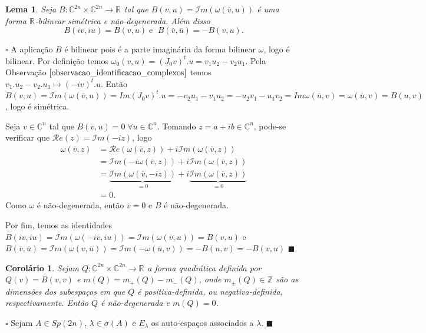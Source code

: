 \documentclass[12pt]{book}
\newtheorem{corolario}[teorema]{Corolário}
\newtheorem{lema}[teorema]{Lema}
\newenvironment{prova}[1]{$\square$ #1}{\hfill$\blacksquare$}
\newcommand{\complexo}[1]{\mathbb{C}^{#1}}
\newcommand{\estruturacomplexa}{J_{0}}
\newcommand{\formaSimpletica}[2]{\omega(#1, #2)}
\newcommand{\formaSimpleticaPadrao}[2]{\omega_{0}(#1, #2)}
\newcommand{\gruposimpletico}[1]{Sp(#1)}
\newcommand{\inteiros}{\mathbb{Z}}
\newcommand{\parteImaginaria}[1]{\mathcal{I}m(#1)}
\newcommand{\parteReal}[1]{\mathcal{R}e(#1)}
\newcommand{\real}[1]{\mathbb{R}^{#1}}
\newcommand{\reta}{\real{}}
\newcommand{\vermelho}[1]{{\color{red}#1}}
\begin{document}
		\begin{lema}
			Seja $B:\complexo{2n}\times \complexo{2n} \to \reta$ tal que $B(v, u ) = \parteImaginaria{\formaSimpletica{\overline{v}}{u}}$ é uma forma $\reta$-bilinear simétrica e não-degenerada. Além disso
			$$
			B(iv,iu) = B(v,u)\;\text{e }\;B(\overline{v},\overline{u})=-B(v,u).
			$$
		\end{lema}
		\begin{prova}
		A aplicação $B$ é bilinear pois é a parte imaginária da forma bilinear $\omega$, logo é bilinear. \vermelho{Por definição temos $\formaSimpleticaPadrao{v}{u} = (\estruturacomplexa v)^{t}.u=v_{1}u_{2}-v_{2}u_{1}$. Pela Observação $\ref{observacao_identificacao_complexos}$ temos $v_{1}.u_{2}-v_{2}.u_{1} \mapsto (-iv)^{t}.u$. Então $B(v,u) =  \parteImaginaria{\omega(\overline{v}, u)}=Im (\estruturacomplexa v)^{t}.u = -v_{2}u_{1} -v_{1}u_{2} = -u_{2}v_{1}-u_{1}v_{2}  = Im \omega(\overline{u}, v) = \omega(\overline{u}, v) = B(u,v)$, logo é simétrica.}
		
		Seja $v \in \complexo{n}$ tal que $B(v, u) = 0 \; \forall u \in \complexo{n}$. Tomando $z=a+ib \in \complexo{n}$, pode-se verificar que $\parteReal{z} = \parteImaginaria{-iz}$, logo 
		$$
			\begin{aligned}
			\formaSimpletica{\overline{v}}{z} &=\parteReal{\formaSimpletica{\overline{v}}{z}} +i \parteImaginaria{\formaSimpletica{\overline{v}}{z}} 
			\\
			&= \parteImaginaria{-i\formaSimpletica{\overline{v}}{z}} +i \parteImaginaria{\formaSimpletica{\overline{v}}{z}}
			\\
			&= \underbrace{\parteImaginaria{\formaSimpletica{\overline{v}}{-iz}}}_{=0} +i \underbrace{\parteImaginaria{\formaSimpletica{\overline{v}}{z}}}_{=0}
			\\
			&=0.
			\end{aligned}
		$$
		Como $\omega$ é não-degenerada, então $\overline{v} = 0$ e $B$ é não-degenerada.
		
		Por fim, temos as identidades $B(iv,iu) = \parteImaginaria{\formaSimpletica{-i\overline{v}}{iu}}= \parteImaginaria{\formaSimpletica{\overline{v}}{u}}=B(v,u)$ e $B(\overline{v},\overline{u})  = \parteImaginaria{\formaSimpletica{v}{\overline{u}}} = \parteImaginaria{-\formaSimpletica{\overline{u}}{v}} = -B(u,v) = -B(v,u)$
		\end{prova}
	
	\begin{corolario}
		Sejam $Q: \complexo{2n} \times \complexo{2n} \to \reta$ a forma quadrática definida por $Q(v) = B(v,v)$ e $m(Q) = m_{+}(Q) - m_{-}(Q) $, onde $m_{\pm}(Q) \in \inteiros$ são as dimensões dos subespaços em que $Q$ é positiva-definida, ou negativa-definida, respectivamente. Então $Q$ é não-degenerada e $m(Q) = 0$.
	\end{corolario}
	\begin{prova}
		\vermelho{Sejam $A \in \gruposimpletico{2n}$, $\lambda \in \sigma(A)$ e $E_{\lambda}$ os auto-espaços associados a $\lambda$.}
	\end{prova}
	
\end{document}

